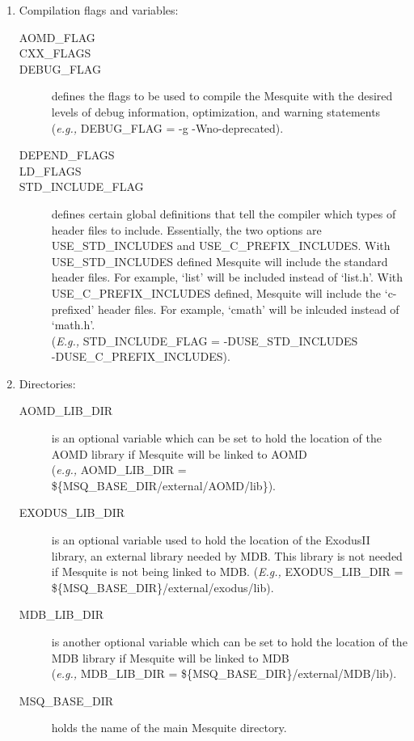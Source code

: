 \begin{enumerate}
\item Compilation flags and variables:
  \begin{description}
  \item[AOMD\_FLAG]
  \item[CXX\_FLAGS]
  \item[DEBUG\_FLAG] defines the flags to be used to compile the Mesquite
	with the desired levels of debug information, optimization, and
	warning statements\\
	({\it e.g.,} DEBUG\_FLAG = -g -Wno-deprecated).
  \item[DEPEND\_FLAGS]
  \item[LD\_FLAGS]
  \item[STD\_INCLUDE\_FLAG] defines certain global definitions that
	tell the compiler which types of header files to include.
 	Essentially, the two options are USE\_STD\_INCLUDES and
	USE\_C\_PREFIX\_INCLUDES.  With USE\_STD\_INCLUDES defined
	Mesquite will include the standard header files.  For example,
	`list' will be included instead of `list.h'.  With
	USE\_C\_PREFIX\_INCLUDES defined, Mesquite will include the
	`c-prefixed' header files.  For example, `cmath' will be
	inlcuded instead of `math.h'.  \\
	({\it E.g.,} STD\_INCLUDE\_FLAG = -DUSE\_STD\_INCLUDES\\
	-DUSE\_C\_PREFIX\_INCLUDES).
  \end{description}
\item Directories:
  \begin{description}
  \item[AOMD\_LIB\_DIR] is an optional variable which can be set
	to hold the location of the AOMD library if Mesquite will
	be linked to AOMD\\
	({\it e.g.,} AOMD\_LIB\_DIR = \$\{MSQ\_BASE\_DIR/external/AOMD/lib\}).
  \item[EXODUS\_LIB\_DIR] is an optional variable used to hold the
	location of the ExodusII library, an external library needed
	by MDB.  This library is not needed if Mesquite is not being
	linked to MDB.
	({\it E.g.,} EXODUS\_LIB\_DIR = \$\{MSQ\_BASE\_DIR\}/external/exodus/lib).
  \item[MDB\_LIB\_DIR] is another optional variable which can be set
	to hold the location of the MDB library if Mesquite will
	be linked to MDB\\
	({\it e.g.,} MDB\_LIB\_DIR = \$\{MSQ\_BASE\_DIR\}/external/MDB/lib).
  \item[MSQ\_BASE\_DIR] holds the name of the main Mesquite directory.

\end{description}
\end{enumerate}

